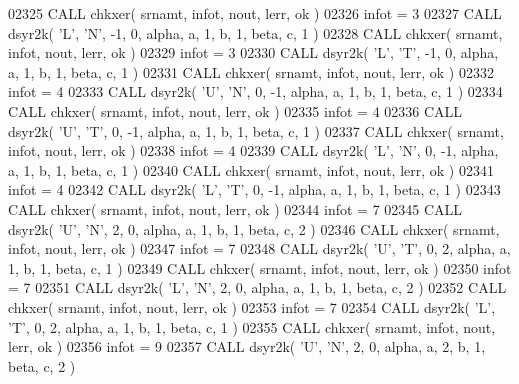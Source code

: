 \begin{DoxyCode}
02325       \textcolor{keyword}{CALL }chkxer( srnamt, infot, nout, lerr, ok )
02326       infot = 3
02327       \textcolor{keyword}{CALL }dsyr2k( \textcolor{stringliteral}{'L'}, \textcolor{stringliteral}{'N'}, -1, 0, alpha, a, 1, b, 1, beta, c, 1 )
02328       \textcolor{keyword}{CALL }chkxer( srnamt, infot, nout, lerr, ok )
02329       infot = 3
02330       \textcolor{keyword}{CALL }dsyr2k( \textcolor{stringliteral}{'L'}, \textcolor{stringliteral}{'T'}, -1, 0, alpha, a, 1, b, 1, beta, c, 1 )
02331       \textcolor{keyword}{CALL }chkxer( srnamt, infot, nout, lerr, ok )
02332       infot = 4
02333       \textcolor{keyword}{CALL }dsyr2k( \textcolor{stringliteral}{'U'}, \textcolor{stringliteral}{'N'}, 0, -1, alpha, a, 1, b, 1, beta, c, 1 )
02334       \textcolor{keyword}{CALL }chkxer( srnamt, infot, nout, lerr, ok )
02335       infot = 4
02336       \textcolor{keyword}{CALL }dsyr2k( \textcolor{stringliteral}{'U'}, \textcolor{stringliteral}{'T'}, 0, -1, alpha, a, 1, b, 1, beta, c, 1 )
02337       \textcolor{keyword}{CALL }chkxer( srnamt, infot, nout, lerr, ok )
02338       infot = 4
02339       \textcolor{keyword}{CALL }dsyr2k( \textcolor{stringliteral}{'L'}, \textcolor{stringliteral}{'N'}, 0, -1, alpha, a, 1, b, 1, beta, c, 1 )
02340       \textcolor{keyword}{CALL }chkxer( srnamt, infot, nout, lerr, ok )
02341       infot = 4
02342       \textcolor{keyword}{CALL }dsyr2k( \textcolor{stringliteral}{'L'}, \textcolor{stringliteral}{'T'}, 0, -1, alpha, a, 1, b, 1, beta, c, 1 )
02343       \textcolor{keyword}{CALL }chkxer( srnamt, infot, nout, lerr, ok )
02344       infot = 7
02345       \textcolor{keyword}{CALL }dsyr2k( \textcolor{stringliteral}{'U'}, \textcolor{stringliteral}{'N'}, 2, 0, alpha, a, 1, b, 1, beta, c, 2 )
02346       \textcolor{keyword}{CALL }chkxer( srnamt, infot, nout, lerr, ok )
02347       infot = 7
02348       \textcolor{keyword}{CALL }dsyr2k( \textcolor{stringliteral}{'U'}, \textcolor{stringliteral}{'T'}, 0, 2, alpha, a, 1, b, 1, beta, c, 1 )
02349       \textcolor{keyword}{CALL }chkxer( srnamt, infot, nout, lerr, ok )
02350       infot = 7
02351       \textcolor{keyword}{CALL }dsyr2k( \textcolor{stringliteral}{'L'}, \textcolor{stringliteral}{'N'}, 2, 0, alpha, a, 1, b, 1, beta, c, 2 )
02352       \textcolor{keyword}{CALL }chkxer( srnamt, infot, nout, lerr, ok )
02353       infot = 7
02354       \textcolor{keyword}{CALL }dsyr2k( \textcolor{stringliteral}{'L'}, \textcolor{stringliteral}{'T'}, 0, 2, alpha, a, 1, b, 1, beta, c, 1 )
02355       \textcolor{keyword}{CALL }chkxer( srnamt, infot, nout, lerr, ok )
02356       infot = 9
02357       \textcolor{keyword}{CALL }dsyr2k( \textcolor{stringliteral}{'U'}, \textcolor{stringliteral}{'N'}, 2, 0, alpha, a, 2, b, 1, beta, c, 2 )

\end{DoxyCode}
